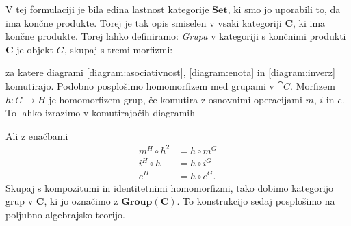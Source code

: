 \documentclass[../kategoricna_logika.tex]{subfiles}
\begin{document}
%
V tej formulaciji je bila edina lastnost kategorije $\mathbf{Set}$, ki smo jo uporabili to,
da ima končne produkte. Torej je tak opis smiselen v vsaki kategoriji $\mathbf{C}$,
ki ima končne produkte. Torej lahko definiramo:
\emph{Grupa} v kategoriji s končnimi produkti $\mathbf{C}$ je objekt
$G$, skupaj s tremi morfizmi:
\begin{center}
\end{center}
za katere diagrami \eqref{diagram:asociativnost}, \eqref{diagram:enota} in \eqref{diagram:inverz}
komutirajo.
%
Podobno posplošimo homomorfizem med grupami v $\cat{C}$. Morfizem
$h : G \to H$ je homomorfizem grup, če komutira z osnovnimi operacijami $m$, $i$ in $e$.
To lahko izrazimo v komutirajočih diagramih
%
\begin{center}
\end{center}
Ali z enačbami
\begin{align*}
m^H \circ h^2 &= h \circ m^G \\
i^H \circ h &= h \circ i^G \\
e^H &= h \circ e^G.
\end{align*}
Skupaj s kompozitumi in identitetnimi homomorfizmi, tako dobimo
kategorijo grup v $\mathbf{C}$, ki jo označimo z $\mathbf{Group}(\mathbf{C})$.
To konstrukcijo sedaj posplošimo na poljubno algebrajsko teorijo.
\end{document}
